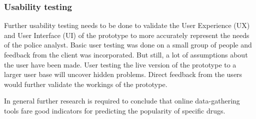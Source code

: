 \subsubsection{Usability testing}
Further usability testing needs to be done to validate the User Experience (UX) and User Interface (UI) of the prototype to more accurately represent the needs of the police analyst. Basic user testing was done on a small group of people and feedback from the client was incorporated. But still, a lot of assumptions about the user have been made. User testing the live version of the prototype to a larger user base will uncover hidden problems. Direct feedback from the users would further validate the workings of the prototype.

In general further research is required to conclude that online data-gathering tools fare good indicators for predicting the popularity of specific drugs.